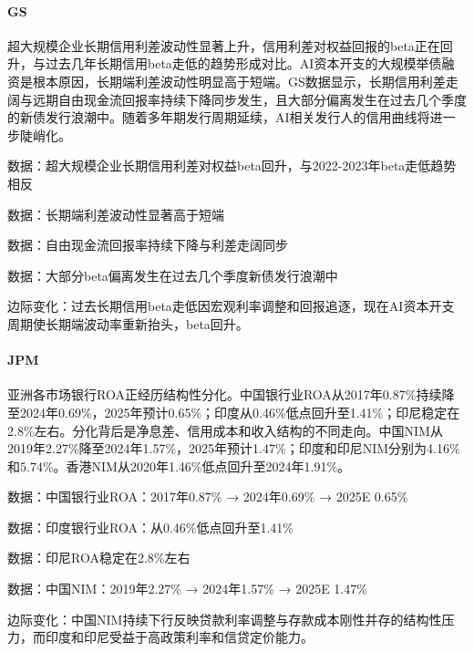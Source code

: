 \documentclass[11pt]{ctexart}
\begin{document}
\paragraph{GS} 超大规模企业长期信用利差波动性显著上升，信用利差对权益回报的beta正在回升，与过去几年长期信用beta走低的趋势形成对比。AI资本开支的大规模举债融资是根本原因，长期端利差波动性明显高于短端。GS数据显示，长期信用利差走阔与远期自由现金流回报率持续下降同步发生，且大部分偏离发生在过去几个季度的新债发行浪潮中。随着多年期发行周期延续，AI相关发行人的信用曲线将进一步陡峭化。
{\small\color{refgray}数据：超大规模企业长期信用利差对权益beta回升，与2022-2023年beta走低趋势相反\par}
{\small\color{refgray}数据：长期端利差波动性显著高于短端\par}
{\small\color{refgray}数据：自由现金流回报率持续下降与利差走阔同步\par}
{\small\color{refgray}数据：大部分beta偏离发生在过去几个季度新债发行浪潮中\par}
{\small\color{refgray}边际变化：过去长期信用beta走低因宏观利率调整和回报追逐，现在AI资本开支周期使长期端波动率重新抬头，beta回升。\par}
\paragraph{JPM} 亚洲各市场银行ROA正经历结构性分化。中国银行业ROA从2017年0.87\%持续降至2024年0.69\%，2025年预计0.65\%；印度从0.46\%低点回升至1.41\%；印尼稳定在2.8\%左右。分化背后是净息差、信用成本和收入结构的不同走向。中国NIM从2019年2.27\%降至2024年1.57\%，2025年预计1.47\%；印度和印尼NIM分别为4.16\%和5.74\%。香港NIM从2020年1.46\%低点回升至2024年1.91\%。
{\small\color{refgray}数据：中国银行业ROA：2017年0.87\% → 2024年0.69\% → 2025E 0.65\%\par}
{\small\color{refgray}数据：印度银行业ROA：从0.46\%低点回升至1.41\%\par}
{\small\color{refgray}数据：印尼ROA稳定在2.8\%左右\par}
{\small\color{refgray}数据：中国NIM：2019年2.27\% → 2024年1.57\% → 2025E 1.47\%\par}
{\small\color{refgray}边际变化：中国NIM持续下行反映贷款利率调整与存款成本刚性并存的结构性压力，而印度和印尼受益于高政策利率和信贷定价能力。\par}
\end{document}
